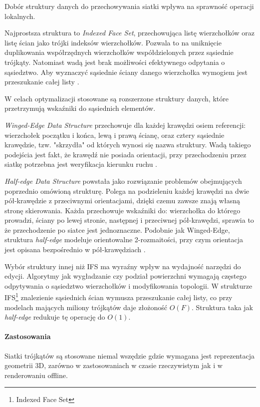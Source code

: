Dobór struktury danych do przechowywania siatki wpływa na sprawność operacji lokalnych.

Najprostsza struktura to \textit{Indexed Face Set}, przechowująca listę wierzchołków oraz listę ścian jako trójki indeksów wierzchołków. Pozwala to na uniknięcie duplikowania współrzędnych wierzchołków współdzielonych przez sąsiednie trójkąty. Natomiast wadą jest brak możliwości efektywnego odpytania o sąsiedztwo. Aby wyznaczyć sąsiednie ściany danego wierzchołka wymogiem jest przeszukanie całej listy \cite{kettner1998}. 

W celach optymalizacji stosowane są rozszerzone struktury danych, które przetrzymują wskaźniki do sąsiednich elementów.

\textit{Winged-Edge Data Structure} przechowuje dla każdej krawędzi osiem referencji: wierzchołek początku i końca, lewą i prawą ścianę, oraz cztery sąsiednie krawędzie, tzw. "skrzydła" od których wynosi się nazwa struktury. Wadą takiego podejścia jest fakt, że krawędź nie posiada orientacji, przy przechodzeniu przez siatkę potrzebna jest weryfikacja kierunku ruchu \cite{kettner1998}.

\textit{Half-edge Data Structure} powstała jako rozwiązanie problemów obejmujących poprzednio omówioną strukturę. Polega na podzieleniu każdej krawędzi na dwie pół-krawędzie z przeciwnymi orientacjami, dzięki czemu zawsze znają własną stronę skierowania. Każda przechowuje wskaźniki do: wierzchołka do którego prowadzi, ściany po lewej stronie, następnej i przeciwnej pół-krawędzi, sprawia to że przechodzenie po siatce jest jednoznaczne. Podobnie jak Winged-Edge, struktura \textit{half-edge} modeluje orientowalne 2-rozmaitości, przy czym orientacja jest opisana bezpośrednio w pół-krawędziach \cite{kettner1998}.

Wybór struktury innej niż IFS ma wyraźny wpływ na wydajność narzędzi do edycji. Algorytmy jak wygładzanie czy podział powierzchni wymagają częstego odpytywania o sąsiedztwo wierzchołków i modyfikowania topologii. W strukturze IFS\footnote{Indexed Face Set} znalezienie sąsiednich ścian wymusza przeszukanie całej listy, co przy modelach mających miliony trójkątów daje złożoność $O(F)$. Struktura taka jak \textit{half-edge} redukuje tę operację do $O(1)$.

\paragraph{Zastosowania}
Siatki trójkątów są stosowane niemal wszędzie gdzie wymagana jest reprezentacja geometrii 3D, zarówno w zastosowaniach w czasie rzeczywistym jak i w renderowaniu offline.

